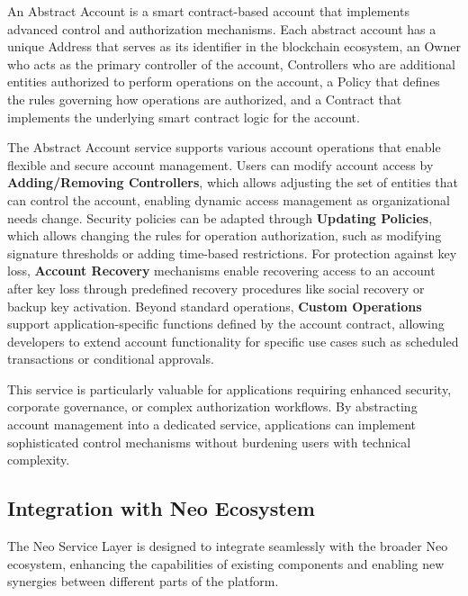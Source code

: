 \documentclass[12pt,a4paper]{article}
\begin{document}
\begin{definition}
An Abstract Account is a smart contract-based account that implements advanced control and authorization mechanisms. Each abstract account has a unique Address that serves as its identifier in the blockchain ecosystem, an Owner who acts as the primary controller of the account, Controllers who are additional entities authorized to perform operations on the account, a Policy that defines the rules governing how operations are authorized, and a Contract that implements the underlying smart contract logic for the account.
\end{definition}

The Abstract Account service supports various account operations that enable flexible and secure account management. Users can modify account access by \textbf{Adding/Removing Controllers}, which allows adjusting the set of entities that can control the account, enabling dynamic access management as organizational needs change. Security policies can be adapted through \textbf{Updating Policies}, which allows changing the rules for operation authorization, such as modifying signature thresholds or adding time-based restrictions. For protection against key loss, \textbf{Account Recovery} mechanisms enable recovering access to an account after key loss through predefined recovery procedures like social recovery or backup key activation. Beyond standard operations, \textbf{Custom Operations} support application-specific functions defined by the account contract, allowing developers to extend account functionality for specific use cases such as scheduled transactions or conditional approvals.

This service is particularly valuable for applications requiring enhanced security, corporate governance, or complex authorization workflows. By abstracting account management into a dedicated service, applications can implement sophisticated control mechanisms without burdening users with technical complexity.

\subsection{Integration with Neo Ecosystem}
\label{subsec:nsl-integration}

The Neo Service Layer is designed to integrate seamlessly with the broader Neo ecosystem, enhancing the capabilities of existing components and enabling new synergies between different parts of the platform.
\end{document}
